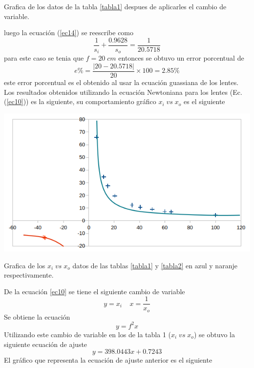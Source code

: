 \documentclass[13,twocolumn,letterpaper]{article}
\newenvironment{Figure}{\par\medskip\noindent\minipage{\linewidth}}{\endminipage\par\medskip}
\begin{document}
\begin{multicols}{2}
\begin{Figure}
			\caption{\footnotesize{Grafica de los datos de la tabla \ref{tabla1} despues de aplicarles el cambio de variable.}}
			\label{fig:fig-6}
		\end{Figure}
	luego la ecuación (\ref{ec14}) se reescribe como 
	\begin{equation}
		\dfrac{1}{s_{i}}+\dfrac{0.9628}{s_{o}}=\dfrac{1}{20.5718}
	\end{equation}
	para este caso se tenia que $f=20 \;cm$ entonces se obtuvo un error porcentual de 
	$$e\%=\dfrac{|20-20.5718|}{20}\times 100=2.85 \%$$
	este error porcentual es el obtenido al usar la ecuación guassiana de los lentes.\\
	Los resultados obtenidos utilizando la ecuación Newtoniana para los lentes (Ec. (\ref{ec10})) es la siguiente, su comportamiento gráfico  $x_{i}\;vs\;x_{o}$ es el siguiente
	\begin{Figure}
		\centering
		\includegraphics[width=\linewidth]{fig7}
		\caption{\footnotesize{Grafica de los $x_{i}\;vs\;x_{o}$ datos de las tablas \ref{tabla1} y \ref{tabla2} en azul y naranje respectivamente.}}
		\label{fig:fig-7}
	\end{Figure} 
	De la ecuación \ref{ec10} se tiene el siguiente cambio de variable 
	\begin{equation}\label{ec16}
		y=x_{i}\;\;\;\; x=\dfrac{1}{x_{o}}
	\end{equation} 
	Se obtiene la ecuación 
	\begin{equation}\label{ec17}
		y=f^{2}x
	\end{equation}  
	Utilizando este cambio de variable en los de la tabla 1 ($x_{i}\;vs\;x_{o}$) se obtuvo la siguiente ecuación de ajuste
	\begin{equation}\label{ec18}
		y=398.0443x+0.7243
	\end{equation} 
	El gráfico que representa la ecuación de ajuste anterior es el siguiente

\end{multicols}
\end{document}
